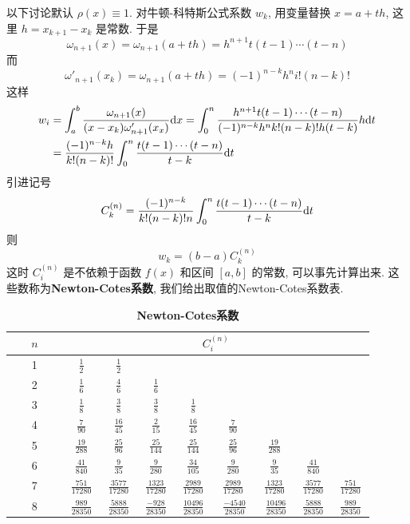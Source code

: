 \documentclass[a4paper]{ctexart}
\begin{document}
{以下讨论默认 $\rho(x) \equiv 1$. 对牛顿-科特斯公式系数 $w_k$, 用变量替换 $x = a + th$, 
这里 $h = x_{k + 1} - x_k$ 是常数. 于是
$$
\omega_{n+1}(x)=\omega_{n+1}(a+th)=h^{n+1}t(t-1)\cdots(t-n)
$$
而
$$
\omega'_{n+1}(x_k)=\omega_{n+1}(a+th)=(-1)^{n-k}h^ni!(n-k)!
$$
这样
\begin{align}
  w_i&=\int^b_a\frac{\omega_{n+1}(x)}{(x-x_k)\omega'_{n+1}(x_x)}
  {\rm d}x=\int^n_0\frac{h^{n+1}t(t-1)\cdots(t-n)}{(-1)^{n-k}h^nk!
  (n-k)!h(t-k)}h{\rm d}t\\
  &=\frac{(-1)^{n-k}h}{k!(n-k)!}\int^n_0\frac{t(t-1)\cdots(t-n)}
  {t-k}{\rm d}t  
\end{align}
引进记号 
\begin{equation}
C_k^{(n)}=\frac{(-1)^{n-k}}{k!(n-k)!n}\int^n_0\frac{t(t-1)\cdots(t-n)
}{t-k}{\rm d}t 
\end{equation}
则 
\begin{equation} 
w_k=(b-a)C_k^{(n)}
\end{equation}
这时 $C_i^{(n)}$ 是不依赖于函数 $f(x)$ 和区间 $[a,b]$ 的常数, 可以事先计算出来.
这些数称为{\bf Newton-Cotes系数}, 我们给出取值的Newton-Cotes系数表.

\begin{table}[h]
\caption{\bf Newton-Cotes系数}
\begin{center}
 \begin{tabular}{|c|c|c|c|c|c|c|c|c|}\hline
 \ \ \   $n$\ \ \   & \multicolumn{8}{|c|}{   $C_i^{(n)}$   }\\
   \hline
  1  &  $\frac{1 }{2} $ & $ \frac{1 }{2}$  &   &    &   &   &   &    \\\hline
  2  &  $\frac{1 }{6} $ & $ \frac{4 }{6}$  & $\frac{1 }{6} $  &    &   &   &   &    \\\hline
  3  &  $\frac{1 }{8} $ & $ \frac{3 }{8}$  & $\frac{3 }{8} $ &$\frac{1 }{8}$    &   &   &   &    \\\hline
  4  &  $\frac{7 }{90}$  & $ \frac{16 }{45}$  & $\frac{2 }{15}$  & $\frac{16 }{45} $   &$ \frac{7 }{90}$  &   &   &    \\\hline
  5  &  $\frac{19 }{288}$  &  $\frac{25 }{96}$  &  $\frac{25 }{144}$ & $\frac{25}{144}$   &$\frac{25 }{96}$   &  $\frac{19 }{288}$   &   &    \\\hline
  6  &  $\frac{41 }{840}$  &  $\frac{9 }{35}$  &  $\frac{9 }{280}$ & $\frac{34}{105}$   &$\frac{9 }{280}$   & $\frac{9 }{35}$   & $\frac{41 }{840}$   &    \\\hline
  7  &  $\frac{751 }{17280}$  &  $\frac{3577 }{17280}$  &  $\frac{1323 }{17280}$ & $\frac{2989 }{17280}$    &$\frac{2989 }{17280}$   &  $\frac{1323 }{17280}$   &   $\frac{3577 }{17280}$  &  $\frac{751}{17280}$    \\\hline
  8  &  $\ \frac{989 }{28350}\ $  &  $\ \frac{5888 }{28350}\ $  & $\ \frac{-928 }{28350}\ $ &$\ \frac{10496 }{28350}\ $   &\ $\frac{-4540 }{28350}\ $  &\ $\frac{10496 }{28350}\ $   & $\ \frac{5888}{28350}\ $  &  $\ \frac{989 }{28350}\ $  \\\hline
 \end{tabular}
\end{center}
\end{table}

}
\end{document}
